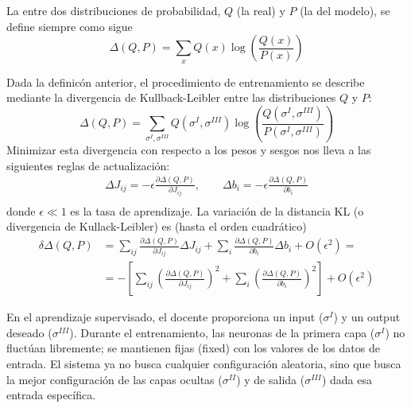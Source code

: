 \begin{definicion}
    La   entre dos distribuciones de probabilidad, $Q$ (la real) y $P$ (la del modelo), se define siempre como sigue
    \begin{equation*}
        \Delta(Q, P) = \sum_{x} Q(x) \log \left( \frac{Q(x)}{P(x)} \right)
    \end{equation*}
\end{definicion}

\noindent
Dada la definicón anterior, el procedimiento de entrenamiento se describe mediante la divergencia de Kullback-Leibler entre las distribuciones $Q$ y $P$:
\begin{equation*}
    \Delta(Q, P) = \sum_{\sigma^I, \sigma^{III}} Q(\sigma^I, \sigma^{III}) \log \left( \frac{Q(\sigma^I, \sigma^{III})}{P(\sigma^I, \sigma^{III})} \right)
\end{equation*}
Minimizar esta divergencia con respecto a los pesos y sesgos nos lleva a las siguientes reglas de actualización:
\begin{align*}
    \Delta J_{ij}=-\epsilon \frac{\partial \Delta(Q, P)}{\partial J_{ij}}, \quad \quad \Delta b_i=-\epsilon \frac{\partial \Delta(Q, P)}{\partial b_i} \\
\end{align*}
donde $\epsilon \ll 1$ es la tasa de aprendizaje. La variación de la distancia KL (o divergencia de Kullack-Leibler) es (hasta el orden cuadrático)
\begin{align*}
    \delta \Delta(Q, P) &= \sum_{ij} \frac{\partial \Delta(Q, P)}{\partial J_{ij}} \Delta J_{ij} + \sum_i \frac{\partial \Delta(Q, P)}{\partial b_i} \Delta b_i + O(\epsilon^2) =\\
    &= -\left[\sum_{ij} \left( \frac{\partial \Delta(Q, P)}{\partial J_{ij}} \right)^2 + \sum_i \left( \frac{\partial \Delta(Q, P)}{\partial b_i} \right)^2\right] + O(\epsilon^2)
\end{align*}

\noindent
En el aprendizaje supervisado, el docente proporciona un input ($\sigma^I$) y un output deseado ($\sigma^{III}$). Durante el entrenamiento, las neuronas de la primera capa ($\sigma^I$) no fluctúan libremente; se mantienen fijas (fixed) con los valores de los datos de entrada. El sistema ya no busca cualquier configuración aleatoria, sino que busca la mejor configuración de las capas ocultas ($\sigma^{II}$) y de salida ($\sigma^{III}$) dada esa entrada específica. \\

